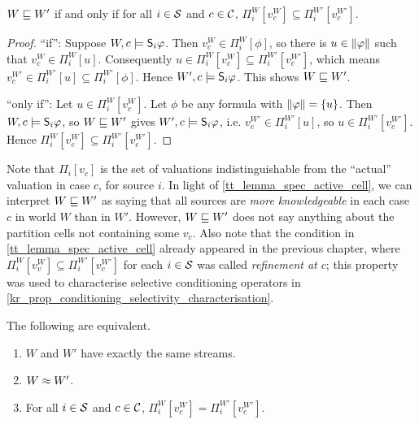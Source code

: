 
\begin{lemma}
    \label{tt_lemma_spec_active_cell}
    $W \specleq W'$ if and only if for all $i \in \srcs$ and $c \in \css$,
    $\Pi^W_i[v^W_c] \subseteq \Pi^{W'}_i[v^{W'}_c]$.
\end{lemma}

\begin{proof}
    ``if'': Suppose $W, c \models \S_i\phi$. Then $v^W_c \in \Pi^W_i[\phi]$, so
    there is $u \in \propmods{\phi}$ such that $v^W_c \in \Pi^W_i[u]$.
    Consequently $u \in \Pi^W_i[v^W_c] \subseteq \Pi^{W'}_i[v^{W'}_c]$, which
    means $v^{W'}_c \in \Pi^{W'}_i[u] \subseteq \Pi^{W'}_i[\phi]$. Hence $W', c
    \models \S_i\phi$. This shows $W \specleq W'$.

    ``only if'': Let $u \in \Pi^W_i[v^W_c]$. Let $\phi$ be any formula with
    $\propmods{\phi} = \{u\}$. Then $W, c \models \S_i\phi$, so $W \specleq W'$
    gives $W', c \models \S_i\phi$, i.e. $v^{W'}_c \in \Pi^{W'}_i[u]$, so $u
    \in \Pi^{W'}_i[v^{W'}_c]$. Hence $\Pi^W_i[v^W_c] \subseteq
    \Pi^{W'}_i[v^{W'}_c]$.
\end{proof}

Note that $\Pi_i[v_c]$ is the set of valuations indistinguishable from the
``actual'' valuation in case $c$, for source $i$. In light of
\cref{tt_lemma_spec_active_cell}, we can interpret $W \specleq W'$ as saying
that all sources are \emph{more knowledgeable} in each case $c$ in world $W$
than in $W'$. However, $W \specleq W'$ does not say anything about the
partition cells not containing some $v_c$. Also note that the condition
in \cref{tt_lemma_spec_active_cell} already appeared in the previous chapter,
where $\Pi^W_i[v^W_v] \subseteq \Pi^{W'}_i[v^{W'}_c]$ for each $i \in \srcs$
was called \emph{refinement at $c$}; this property was used to characterise
selective conditioning operators in
\cref{kr_prop_conditioning_selectivity_characterisation}.

\begin{proposition}
    \label{tt_prop_speceq_equivalent_conditions}
    The following are equivalent.
    \begin{enumerate}
        \item\label{tt_item_same_streams} $W$ and $W'$ have exactly the same
            streams.
        \item\label{tt_item_speceq} $W \speceq W'$.
        \item\label{tt_item_active_cells_equal} For all $i \in \srcs$ and $c \in
            \css$, $\Pi^W_i[v^W_c] = \Pi^{W'}_i[v^{W'}_c]$.
    \end{enumerate}
\end{proposition}

